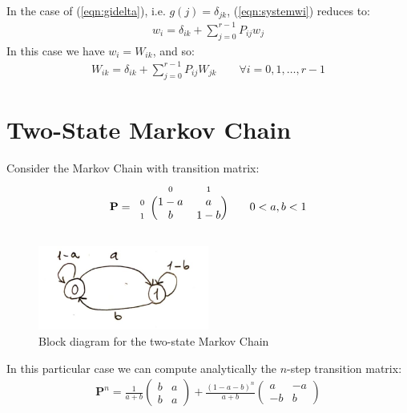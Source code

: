 \documentclass[../template.tex]{subfiles}
\begin{document}
In the case of (\ref{eqn:gidelta}), i.e. $g(j) = \delta_{jk}$, (\ref{eqn:systemwi}) reduces to:
\begin{align*}
    w_i = \delta_{ik} + \sum_{j=0}^{r-1} P_{ij} w_j
\end{align*}
In this case we have $w_i = W_{ik}$, and so:
\begin{align*}
    W_{ik} = \delta_{ik} + \sum_{j=0}^{r-1} P_{ij} W_{jk} \qquad \forall i = 0,1,\dots, r-1
\end{align*}

\section{Two-State Markov Chain}
Consider the Markov Chain with transition matrix:
\begin{align*}
    \textbf{P} = \begin{blockarray}{l*{2}{c}}
        \begin{block}{l*{2}{>{\scriptstyle}c<{}}}
            & 0 & 1 \\
        \end{block}
        \begin{block}{>{\scriptstyle}r<{}(*{2}{c})}
            0 & 1-a  & a \\
            1 & b   & 1-b\\
        \end{block}
    \end{blockarray} \qquad 0<a,b<1
\end{align*}

\begin{figure}[htp]
    \centering
    \includegraphics[width=0.5\textwidth]{image004.png}
    \caption{Block diagram for the two-state Markov Chain}
\end{figure}

In this particular case we can compute analytically the $n$-step transition matrix:
\begin{align}
    \textbf{P}^n = \frac{1}{a+b} \left(\begin{array}{cc}
    b & a \\ 
    b & a
    \end{array}\right)  + \frac{(1-a-b)^n}{a+b} \left(\begin{array}{cc}
    a & -a \\ 
    -b & b
    \end{array}\right) \label{eqn:n-matrix}
\end{align}
\end{document}
